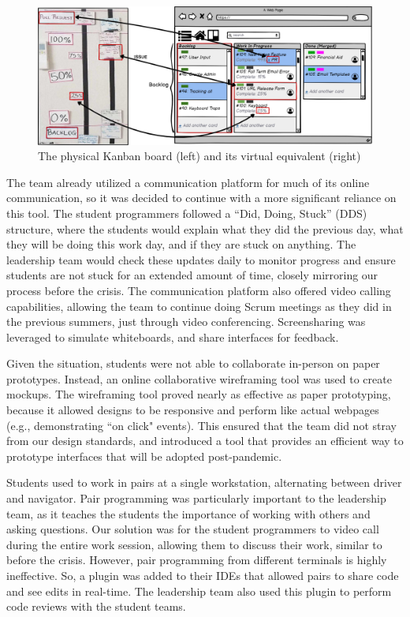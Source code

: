 \begin{figure}[h]
 \centering
 \includegraphics[width=0.8\linewidth]{updatedTrelloKanban.png}
 \caption{The physical Kanban board (left) and its virtual equivalent (right)}
 \label{fig:digitalkanban}
\end{figure}

The team already utilized a communication platform for much of its online communication, so it was decided to continue with a more significant reliance on this tool. The student programmers followed a ``Did, Doing, Stuck'' (DDS) structure, where the students would explain what they did the previous day, what they will be doing this work day, and if they are stuck on anything. The leadership team would check these updates daily to monitor progress and ensure students are not stuck for an extended amount of time, closely mirroring our process before the crisis. The communication platform also offered video calling capabilities, allowing the team to continue doing Scrum meetings as they did in the previous summers, just through video conferencing. Screensharing was leveraged to simulate whiteboards, and share interfaces for feedback.

Given the situation, students were not able to collaborate in-person on paper prototypes. Instead, an online collaborative wireframing tool was used to create mockups. The wireframing tool proved nearly as effective as paper prototyping, because it allowed designs to be responsive and perform like actual webpages (e.g., demonstrating ``on click" events). This ensured that the team did not stray from our design standards, and introduced a tool that provides an efficient way to prototype interfaces that will be adopted post-pandemic.

Students used to work in pairs at a single workstation, alternating between driver and navigator. Pair programming was particularly important to the leadership team, as it teaches the students the importance of working with others and asking questions. Our solution was for the student programmers to video call during the entire work session, allowing them to discuss their work, similar to before the crisis. However, pair programming from different terminals is highly ineffective. So, a plugin was added to their IDEs that allowed pairs to share code and see edits in real-time. The leadership team also used this plugin to perform code reviews with the student teams.

